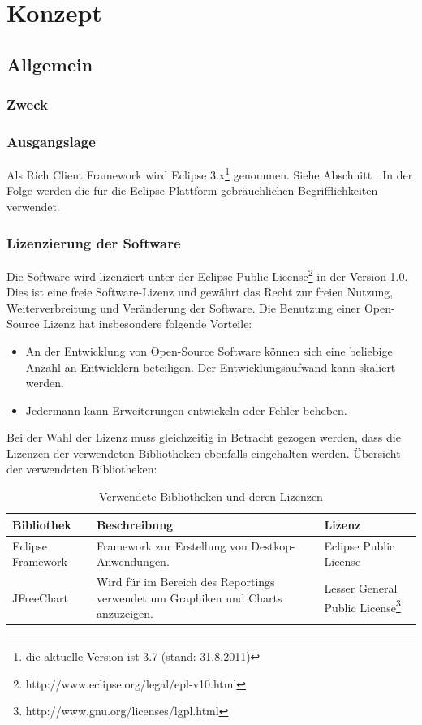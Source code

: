 \chapter{Konzept}
\section{Allgemein}
\subsection{Zweck}

\subsection{Ausgangslage}
Als Rich Client Framework wird Eclipse 3.x\footnote{die aktuelle Version ist 3.7 (stand: 31.8.2011)} genommen. Siehe Abschnitt . In der Folge werden die für die Eclipse Plattform gebräuchlichen Begrifflichkeiten verwendet. 

\subsection{Lizenzierung der Software}
Die Software wird lizenziert unter der Eclipse Public License\footnote{http://www.eclipse.org/legal/epl-v10.html} in der Version 1.0. Dies ist eine freie Software-Lizenz und gewährt das Recht zur freien Nutzung, Weiterverbreitung und Veränderung der Software. Die Benutzung einer Open-Source Lizenz hat insbesondere folgende Vorteile:
\begin{itemize}
	\item An der Entwicklung von Open-Source Software können sich eine beliebige Anzahl an Entwicklern beteiligen. Der Entwicklungsaufwand kann skaliert werden.
	\item Jedermann kann Erweiterungen entwickeln oder Fehler beheben.
\end{itemize}

Bei der Wahl der Lizenz muss gleichzeitig in Betracht gezogen werden, dass die Lizenzen der verwendeten Bibliotheken ebenfalls eingehalten werden. Übersicht der verwendeten Bibliotheken:

\begin{longtable}{|p{3cm}|p{7cm}|p{4cm}|}
    \caption{Verwendete Bibliotheken und deren Lizenzen}\\\hline
	\textbf{Bibliothek} & \textbf{Beschreibung}  & \textbf{Lizenz}\\\hline
	Eclipse Framework & Framework zur Erstellung von Destkop-Anwendungen. & Eclipse Public License\\\hline 
	JFreeChart & Wird für im Bereich des Reportings verwendet um Graphiken und Charts anzuzeigen. & Lesser General Public License\footnote{http://www.gnu.org/licenses/lgpl.html}\\\hline
\end{longtable}

